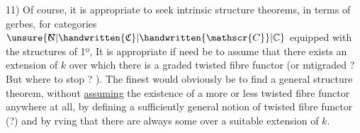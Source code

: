 11) Of course, it is appropriate to seek intrinsic structure theorems, in terms of gerbes, for categories $\unsure{\rlap{\(\mathrm N\)}C|\handwritten{\mathfrak{C}}|\handwritten{\mathscr{C}}|\mathbb{C}}$ equipped with the structures of 1º, It is appropriate if need be to assume that there exists an extension of $k$ over which there is a graded twisted fibre functor (or mtigraded ? But where to stop ? ). The finest would obviously be to find a general structure theorem, without \uline{assuming} the existence of a more or less twisted fibre functor anywhere at all, by defining a sufficiently general notion of twisted fibre functor (?) and by rving that there are always some over a suitable extension of $k$.

